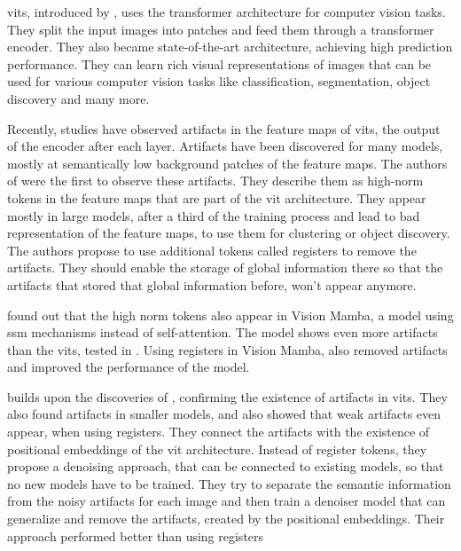 \documentclass[conference]{IEEEtran}
\begin{document}
  \acfp{vit}, introduced by \cite{visiontransformers2021}, uses the transformer architecture for computer vision tasks. They split the input images into patches and feed them through a transformer encoder. They also became state-of-the-art architecture, achieving high prediction performance. They can learn rich visual representations of images that can be used for various computer vision tasks like classification, segmentation, object discovery and many more. \cite{visiontransformers2021} \cite{vit-state-challenges}

  Recently, studies have observed artifacts in the feature maps of \acp{vit}, the output of the encoder after each layer. Artifacts have been discovered for many models, mostly at semantically low background patches of the feature maps. \cite{registers} \cite{denoising} The authors of \cite{registers} were the first to observe these artifacts. They describe them as high-norm tokens in the feature maps that are part of the \ac{vit} architecture. They appear mostly in large models, after a third of the training process and lead to bad representation of the feature maps, to use them for clustering or object discovery. The authors propose to use additional tokens called registers to remove the artifacts. They should enable the storage of global information there so that the artifacts that stored that global information before, won't appear anymore.

  \cite{mamba-needs-registers} found out that the high norm tokens also appear in Vision Mamba, a model using \ac{ssm} mechanisms instead of self-attention. The model shows even more artifacts than the \acp{vit}, tested in \cite{registers}. Using registers in Vision Mamba, also removed artifacts and improved the performance of the model. \cite{mamba-needs-registers}

  \cite{denoising} builds upon the discoveries of \cite{registers}, confirming the existence of artifacts in \acp{vit}. They also found artifacts in smaller models, and also showed that weak artifacts even appear, when using registers. They connect the artifacts with the existence of positional embeddings of the \ac{vit} architecture. Instead of register tokens, they propose a denoising approach, that can be connected to existing models, so that no new models have to be trained. They try to separate the semantic information from the noisy artifacts for each image and then train a denoiser model that can generalize and remove the artifacts, created by the positional embeddings. Their approach performed better than using registers \cite{denoising}
\end{document}
